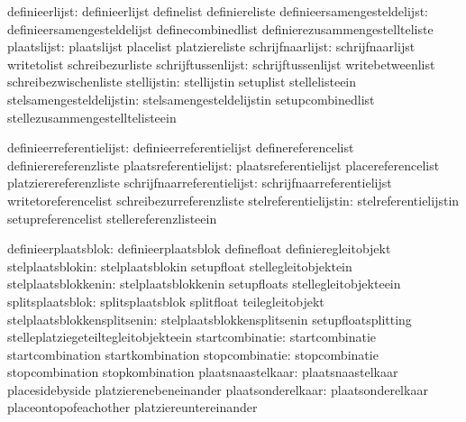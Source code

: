                definieerlijst:  definieerlijst               definelist
                                definiereliste
  definieersamengesteldelijst:  definieersamengesteldelijst  definecombinedlist
                                definierezusammengestellteliste
                  plaatslijst:  plaatslijst                  placelist
                                platziereliste
             schrijfnaarlijst:  schrijfnaarlijst             writetolist
                                schreibezurliste
           schrijftussenlijst:  schrijftussenlijst           writebetweenlist
                                schreibezwischenliste
                  stellijstin:  stellijstin                  setuplist
                                stellelisteein
     stelsamengesteldelijstin:  stelsamengesteldelijstin     setupcombinedlist
                                stellezusammengestelltelisteein

     definieerreferentielijst:  definieerreferentielijst     definereferencelist
                                definierereferenzliste
        plaatsreferentielijst:  plaatsreferentielijst        placereferencelist
                                platzierereferenzliste
   schrijfnaarreferentielijst:  schrijfnaarreferentielijst   writetoreferencelist
                                schreibezurreferenzliste
        stelreferentielijstin:  stelreferentielijstin        setupreferencelist
                                stellereferenzlisteein

          definieerplaatsblok:  definieerplaatsblok          definefloat
                                definieregleitobjekt
             stelplaatsblokin:  stelplaatsblokin             setupfloat
                                stellegleitobjektein
          stelplaatsblokkenin:  stelplaatsblokkenin          setupfloats
                                stellegleitobjekteein
             splitsplaatsblok:  splitsplaatsblok             splitfloat
                                teilegleitobjekt
  stelplaatsblokkensplitsenin:  stelplaatsblokkensplitsenin  setupfloatsplitting
                                stelleplatziegeteiltegleitobjekteein
              startcombinatie:  startcombinatie              startcombination
                                startkombination
               stopcombinatie:  stopcombinatie               stopcombination
                                stopkombination
            plaatsnaastelkaar:  plaatsnaastelkaar            placesidebyside
                                platzierenebeneinander
            plaatsonderelkaar:  plaatsonderelkaar            placeontopofeachother
                                platziereuntereinander

